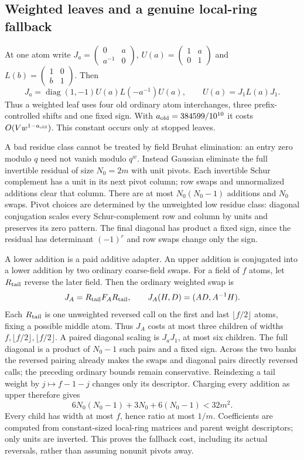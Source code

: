 \subsection{Weighted leaves and a genuine local-ring fallback}
At one atom write $J_a=\left(\begin{smallmatrix}0&a\\a^{-1}&0\end{smallmatrix}\right)$,
$U(a)=\left(\begin{smallmatrix}1&a\\0&1\end{smallmatrix}\right)$ and
$L(b)=\left(\begin{smallmatrix}1&0\\b&1\end{smallmatrix}\right)$.
Then
\[
 J_a=\operatorname{diag}(1,-1)U(a)L(-a^{-1})U(a),
 \qquad U(a)=J_1L(a)J_1.
\]
Thus a weighted leaf uses four old ordinary atom interchanges, three
prefix-controlled shifts and one fixed sign. With
$a_{\rm old}=384599/10^{10}$ it costs $O(Vw^{1-a_{\rm old}})$.
This constant occurs only at stopped leaves.

A bad residue class cannot be treated by field Bruhat elimination:
an entry zero modulo $q$ need not vanish modulo $q^w$. Instead Gaussian
eliminate the full invertible residual of size $N_0=2m$ with unit pivots.
Each invertible Schur complement has a unit in its next pivot column;
row swaps and unnormalized additions clear that column. There are at most
$N_0(N_0-1)$ additions and $N_0$ swaps. Pivot choices are determined by
the unweighted low residue class: diagonal conjugation scales every
Schur-complement row and column by units and preserves its zero pattern.
The final diagonal has product a fixed sign, since the residual has
determinant $(-1)^r$ and row swaps change only the sign.

A lower addition is a paid additive adapter. An upper addition is
conjugated into a lower addition by two ordinary coarse-field swaps.
For a field of $f$ atoms, let $R_{\rm tail}$ reverse the later field.
Then the ordinary weighted swap is
\[
 J_A=R_{\rm tail}F_AR_{\rm tail},\qquad
 J_A(H,D)=(AD,A^{-1}H).
\]
Each $R_{\rm tail}$ is one unweighted reversed call on the first and last
$\lfloor f/2\rfloor$ atoms, fixing a possible middle atom. Thus $J_A$
costs at most three children of widths $f,\lfloor f/2\rfloor,
\lfloor f/2\rfloor$. A paired diagonal scaling is $J_aJ_1$, at most six
children. The full diagonal is a product of $N_0-1$ such pairs and a fixed
sign. Across the two banks the reversed pairing already makes the swaps
and diagonal pairs directly reversed calls; the preceding ordinary bounds
remain conservative. Reindexing a tail weight by $j\mapsto f-1-j$ changes
only its descriptor. Charging every addition as upper therefore gives
\[
 6N_0(N_0-1)+3N_0+6(N_0-1)<32m^2.
\]
Every child has width at most $f$, hence ratio at most $1/m$. Coefficients
are computed from constant-sized local-ring matrices and parent weight
descriptors; only units are inverted. This proves the fallback cost,
including its actual reversals, rather than assuming nonunit pivots away.

